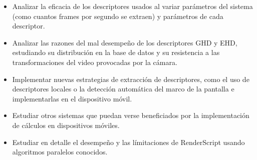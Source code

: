 \begin{itemize}
\item Analizar la eficacia de los descriptores usados al variar parámetros del sistema (como cuantos frames por segundo se extraen) y parámetros de cada descriptor.
\item Analizar las razones del mal desempeño de los descriptores GHD y EHD, estudiando su distribución en la base de datos y su resistencia a las transformaciones del video provocadas por la cámara.
\item Implementar nuevas estrategias de extracción de descriptores, como el uso de descriptores locales o la detección automática del marco de la pantalla e implementarlas en el dispositivo móvil.
\item Estudiar otros sistemas que puedan verse beneficiados por la implementación de cálculos en dispositivos móviles.
\item Estudiar en detalle el desempeño y las límitaciones de RenderScript usando algoritmos paralelos conocidos.
\end{itemize}

